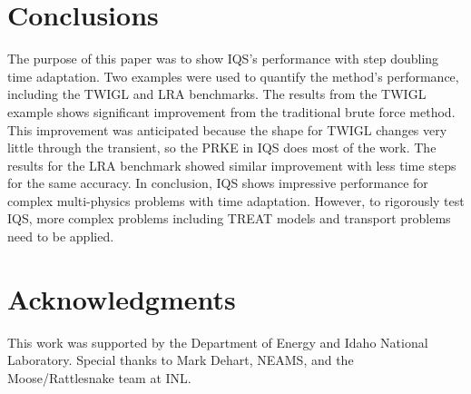 \documentclass{anstrans}
\begin{document}
\section{Conclusions}

The purpose of this paper was to show IQS's performance with step doubling time adaptation.  Two examples were used to quantify the method's performance, including the TWIGL and LRA benchmarks.  The results from the TWIGL example shows significant improvement from the traditional brute force method.  This improvement was anticipated because the shape for TWIGL changes very little through the transient, so the PRKE in IQS does most of the work.  The results for the LRA benchmark showed similar improvement with less time steps for the same accuracy.  In conclusion, IQS shows impressive performance for complex multi-physics problems with time adaptation.  However, to rigorously test IQS, more complex problems including TREAT models and transport problems need to be applied.


\section{Acknowledgments}

This work was supported by the Department of Energy and Idaho National Laboratory.  Special thanks to Mark Dehart, NEAMS, and the Moose/Rattlesnake team at INL.



\end{document}
